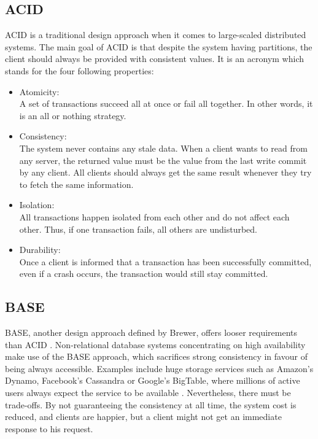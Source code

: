 \subsection{ACID}
\label{sec:background_acid}
ACID is a traditional design approach \cite{brewer2012cap} when it comes to large-scaled distributed systems. The main goal of ACID is that despite the system having partitions, the client should always be provided with consistent values. It is an acronym which stands for the four following properties:
\begin{itemize}
\item Atomicity:\\
A set of transactions succeed all at once or fail all together. In other words, it is an all or nothing strategy.
\item Consistency: \\
The system never contains any stale data. When a client wants to read from any server, the returned value must be the value from the last write commit by any client. All clients should always get the same result whenever they try to fetch the same information.
\item Isolation:\\
All transactions happen isolated from each other and do not affect each other. Thus, if one transaction fails, all others are undisturbed.
\item Durability:\\
Once a client is informed that a transaction has been successfully committed, even if a crash occurs, the transaction would still stay committed.
\end{itemize} 

\subsection{BASE}
\label{sec:background_base}
BASE, another design approach defined by Brewer, offers looser requirements than ACID \cite{brewer2012cap}. Non-relational database systems concentrating on high availability make use of the BASE approach, which sacrifices strong consistency in favour of being always accessible. Examples include huge storage services such as Amazon's Dynamo, Facebook's Cassandra or Google's BigTable, where millions of active users always expect the service to be available \cite{kalid2017big}. Nevertheless, there must be trade-offs. By not guaranteeing the consistency at all time, the system cost is reduced, and clients are happier, but a client might not get an immediate response to his request.

